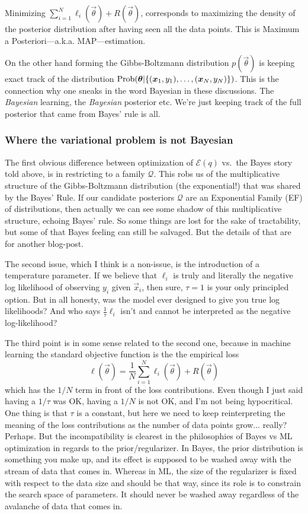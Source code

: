 \documentclass[12pt]{amsart}
\begin{document}
Minimizing $\sum_{i = 1}^N \ell_i (\vec{\theta}) + R(\vec{\theta})$, corresponds to maximizing the density of the posterior distribution after having seen all the data points. This is Maximum a Posteriori---a.k.a. MAP---estimation. 

On the other hand forming the Gibbs-Boltzmann distribution $p(\vec{\theta})$ is keeping exact track of the distribution $\operatorname{Prob}(\mathbf{\boldsymbol{\theta}} | \{(\mathbf{\boldsymbol{x}}_1, y_1), \ldots, (\mathbf{\boldsymbol{x}}_N, y_N)\})$. This is the connection why one sneaks in the word Bayesian in these discussions. The \emph{Bayesian} learning, the \emph{Bayesian} posterior etc. We're just keeping track of the full posterior that came from Bayes' rule is all.

\subsubsection*{Where the variational problem is not Bayesian}

The first obvious difference between optimization of $\mathcal{E}(q)$ vs.\ the Bayes story told above, is in restricting to a family $\mathcal{Q}$. This robs us of the multiplicative structure of the Gibbs-Boltzmann distribution (the exponential!) that was shared by the Bayes' Rule. If our candidate posteriors $\mathcal{Q}$ are an Exponential Family (EF) of distributions, then actually we can see some shadow of this multiplicative structure, echoing Bayes' rule. So some things are lost for the sake of tractability, but some of that Bayes feeling can still be salvaged. But the details of that are for another blog-post. 

The second issue, which I think is a non-issue, is the introduction of a temperature parameter. If we believe that $\ell_i$ is truly and literally the negative log likelihood of observing $y_i$ given $\vec{x}_i$, then sure, $\tau = 1$ is your only principled option. But in all honesty, was the model ever designed to give you true log likelihoods? And who says $\frac{1}{\tau} \ell_i$ isn't and cannot be interpreted as the negative log-likelihood? 

The third point is in some sense related to the second one, because in machine learning the standard objective function is the the empirical loss
\[
	\ell(\vec{\theta}) = \frac{1}{N} \sum_{i = 1}^N \ell_i(\vec{\theta}) + R(\vec{\theta})
\] 
which has the $1/N$ term in front of the loss contributions. Even though I just said having a $1/\tau$ was OK, having a $1/N$ is not OK, and I'm not being hypocritical. One thing is that $\tau$ is a constant, but here we need to keep reinterpreting the meaning of the loss contributions as the number of data points grow... really? Perhaps. But the incompatibility is clearest in the philosophies of Bayes vs ML optimization in regards to the prior/regularizer. In Bayes, the prior distribution is something you make up, and its effect is supposed to be washed away with the stream of data that comes in. Whereas in ML, the size of the regularizer is fixed with respect to the data size and should be that way, since its role is to constrain the search space of parameters. It should never be washed away regardless of the avalanche of data that comes in.
\end{document}
